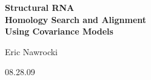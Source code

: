 \documentclass[landscape]{slides}
\begin{document}
\begin{slide}
\begin{center}
\large{\textbf{Structural RNA \\ Homology Search and Alignment
    \\ Using Covariance Models}}

\normalsize

Eric Nawrocki


08.28.09




\end{center}
\end{slide}
\begin{slide}
\end{slide}
\begin{slide}
\end{slide}
\begin{slide}
\end{slide}
\begin{slide}
\end{slide}

\end{document}
